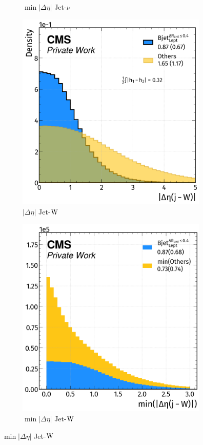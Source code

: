 \begin{figure}[H]
\begin{subfigure}{0.4825\linewidth}
        \caption{$\min|\Delta \eta|$ Jet-$\nu$}
    \end{subfigure}  
    \hfill
    \begin{subfigure}{0.49\linewidth}
        \centering
        \includegraphics[width=1\linewidth]{fig//chap08-kin_reco/deta_W.png}
        \caption{$|\Delta \eta|$ Jet-${\text{W}}$}
    \end{subfigure}
    \hfill
    \begin{subfigure}{0.4825\linewidth}  
        \centering
        \includegraphics[width=1\linewidth]{fig//chap08-kin_reco/min_deta_W.png}
        \caption{$\min|\Delta \eta|$ Jet-${\text{W}}$}
    \end{subfigure}  
\end{figure}
